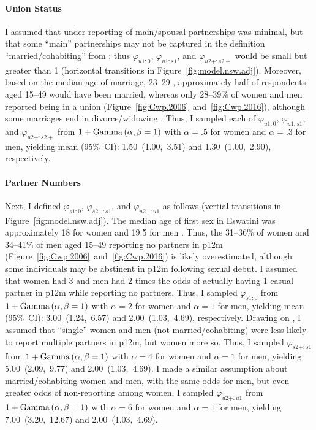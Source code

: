 \paragraph{Union Status}
I assumed that under-reporting of main/spousal partnerships was minimal,
but that some ``main'' partnerships may not be captured in
the definition ``married/cohabiting'' from \cite{SDHS2006,SHIMS2};
thus $\varphi_{u1:0}$, $\varphi_{u1:s1}$, and $\varphi_{u2+:s2+}$
would be small but greater than 1
(horizontal transitions in Figure~\ref{fig:model.nsw.adj}).
Moreover, based on the median age of marriage, 23--29 \cite{SDHS2006},
approximately half of respondents aged 15--49 would have been married,
whereas only 28--39\% of women and men reported being in a union
(Figure~\ref{fig:Cwp.2006}~and~\ref{fig:Cwp.2016}),
although some marriages end in divorce/widowing \cite{SDHS2006}.
Thus, I sampled each of $\varphi_{u1:0}$, $\varphi_{u1:s1}$, and $\varphi_{u2+:s2+}$
from $1+\operatorname{Gamma}\,(\alpha,\beta=1)$
with $\alpha=.5$ for women and $\alpha=.3$ for men,
yielding mean (95\%~CI): 1.50~(1.00,~3.51) and 1.30~(1.00,~2.90), respectively.
\paragraph{Partner Numbers}
Next, I defined $\varphi_{s1:0}$, $\varphi_{s2+:s1}$, and $\varphi_{u2+:u1}$ as follows
(vertial transitions in Figure~\ref{fig:model.nsw.adj}).
The median age of first sex in Eswatini was
approximately 18 for women and 19.5 for men \cite{SDHS2006}.
Thus, the 31--36\% of women and 34--41\% of men aged 15--49 reporting no partners in p12m
(Figure~\ref{fig:Cwp.2006}~and~\ref{fig:Cwp.2016}) is likely overestimated,
although some individuals may be abstinent in p12m following sexual debut.
I assumed that women had 3 and men had 2 times the odds of
actually having 1 casual partner in p12m while reporting no partners.
Thus, I sampled $\varphi_{s1:0}$ from $1+\operatorname{Gamma}\,(\alpha,\beta=1)$
with $\alpha=2$ for women and $\alpha=1$ for men,
yielding mean (95\%~CI): 3.00~(1.24,~6.57) and 2.00~(1.03,~4.69), respectively.
Drawing on \cite{Behanzin2013}, I assumed that ``single'' women and men (not married/cohabiting)
were less likely to report multiple partners in p12m, but women more so.
Thus, I sampled $\varphi_{s2+:s1}$ from $1+\operatorname{Gamma}\,(\alpha,\beta=1)$
with $\alpha=4$ for women and $\alpha=1$ for men,
yielding 5.00~(2.09,~9.77) and 2.00~(1.03,~4.69).
I made a similar assumption about married/cohabiting women and men,
with the same odds for men, but even greater odds of non-reporting among women.
I sampled $\varphi_{u2+:u1}$ from $1+\operatorname{Gamma}\,(\alpha,\beta=1)$
with $\alpha=6$ for women and $\alpha=1$ for men,
yielding 7.00~(3.20,~12.67) and 2.00~(1.03,~4.69).
